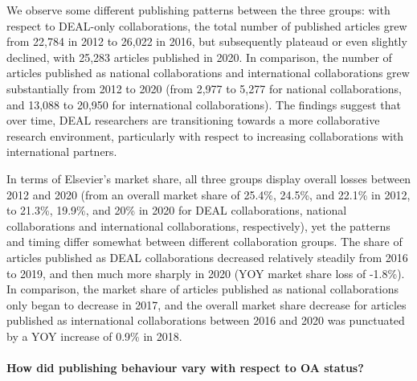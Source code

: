 \documentclass[
]{article}
\begin{document}
We observe some different publishing patterns between the three groups: with respect to DEAL-only collaborations, the total number of published articles grew from 22,784 in 2012 to 26,022 in 2016, but subsequently plateaud or even slightly declined, with 25,283 articles published in 2020. In comparison, the number of articles published as national collaborations and international collaborations grew substantially from 2012 to 2020 (from 2,977 to 5,277 for national collaborations, and 13,088 to 20,950 for international collaborations). The findings suggest that over time, DEAL researchers are transitioning towards a more collaborative research environment, particularly with respect to increasing collaborations with international partners.

In terms of Elsevier's market share, all three groups display overall losses between 2012 and 2020 (from an overall market share of 25.4\%, 24.5\%, and 22.1\% in 2012, to 21.3\%, 19.9\%, and 20\% in 2020 for DEAL collaborations, national collaborations and international collaborations, respectively), yet the patterns and timing differ somewhat between different collaboration groups. The share of articles published as DEAL collaborations decreased relatively steadily from 2016 to 2019, and then much more sharply in 2020 (YOY market share loss of -1.8\%). In comparison, the market share of articles published as national collaborations only began to decrease in 2017, and the overall market share decrease for articles published as international collaborations between 2016 and 2020 was punctuated by a YOY increase of 0.9\% in 2018.

\hypertarget{how-did-publishing-behaviour-vary-with-respect-to-oa-status}{%
\paragraph{How did publishing behaviour vary with respect to OA status?}\label{how-did-publishing-behaviour-vary-with-respect-to-oa-status}}
\end{document}
